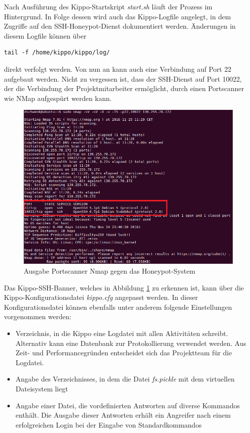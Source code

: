 Nach Ausführung des Kippo-Startskript \textit{start.sh} läuft der Prozess im Hintergrund. In Folge dessen wird auch das Kippo-Logfile angelegt, in dem Zugriffe auf den SSH-Honeypot-Dienst dokumentiert werden. Änderungen in diesem Logfile können über

\begin{lstlisting}[style=customc]
tail -f /home/kippo/kippo/log/
\end{lstlisting}

direkt verfolgt werden. Von nun an kann auch eine Verbindung auf Port 22 aufgebaut werden. Nicht zu vergessen ist, dass der SSH-Dienst auf Port 10022, der die Verbindung der Projektmitarbeiter ermöglicht, durch einen Portscanner wie NMap aufgespürt werden kann.

\begin{figure}[ht]
	\centering
		\includegraphics[width=1.0\textwidth]{img/nmap_ssh.png}
	\caption{Ausgabe Portscanner Nmap gegen das Honeypot-System}
	\label{fig:nmap_ssh}
\end{figure}

Das Kippo-SSH-Banner, welches in Abbildung \ref{fig:nmap_ssh} zu erkennen ist, kann über die Kippo-Konfigurationsdatei \textit{kippo.cfg} angepasst werden. In dieser Konfigurationsdatei können ebenfalls unter anderem folgende Einstellungen vorgenommen werden:

\begin{itemize}
\item Verzeichnis, in die Kippo eine Logdatei mit allen Aktivitäten schreibt. Alternativ kann eine Datenbank zur Protokollierung verwendet werden. Aus Zeit- und Performancegründen entscheidet sich das Projektteam für die Logdatei.
\item Angabe des Verzeichnisses, in dem die Datei \textit{fs.pickle} mit dem virtuellen Dateisystem liegt
\item Angabe einer Datei, die vordefinierten Antworten auf diverse Kommandos enthält. Die Ausgabe dieser Antworten erhält ein Angreifer nach einem erfolgreichen Login bei der Eingabe von Standardkommandos
\end{itemize}

